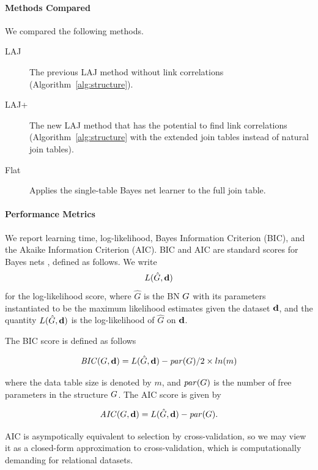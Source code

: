 \documentclass{article}
\begin{document}
\paragraph{Methods Compared}

We compared the following methods.

\begin{description}
\item[LAJ] The previous LAJ method without link correlations (Algorithm~\ref{alg:structure}).
\item[LAJ+] The new LAJ method that has the potential to find link correlations (Algorithm~\ref{alg:structure} with the extended join tables instead of natural join tables).
\item[Flat] Applies the single-table Bayes net learner to the full join table.
\end{description}

\paragraph{Performance Metrics} We report learning time, log-likelihood, Bayes Information Criterion (BIC), and the Akaike Information Criterion (AIC). BIC and AIC are standard scores for Bayes nets \cite{Chickering2003}, defined as follows. We write 
$$L(\hat{G},\mathbf{d})$$ for the log-likelihood score,
where $\hat{G}$ is the BN $G$ with its parameters instantiated to be the maximum likelihood estimates given the dataset $\mathbf{d}$, and the quantity $L(\hat{G},\mathbf{d})$ is the log-likelihood of $\hat{G}$ on $\mathbf{d}$. 

The BIC score is defined as follows \cite{Chickering2003,Schulte2011}

$$\mathit{BIC}(G,\mathbf{d}) = L(\hat{G},\mathbf{d}) - \mathit{par}(G)/2 \times ln(m)$$

where the data table size is denoted by $m$, and $\mathit{par}(G)$ is the number of free parameters in the structure $G$. The AIC score is given by 

$$\mathit{AIC}(G,\mathbf{d}) = L(\hat{G},\mathbf{d}) - \mathit{par}(G). $$

 AIC is asympotically equivalent to selection by cross-validation, so we may view it as a closed-form approximation to cross-validation,  which is computationally demanding for relational datasets. 
\end{document}

